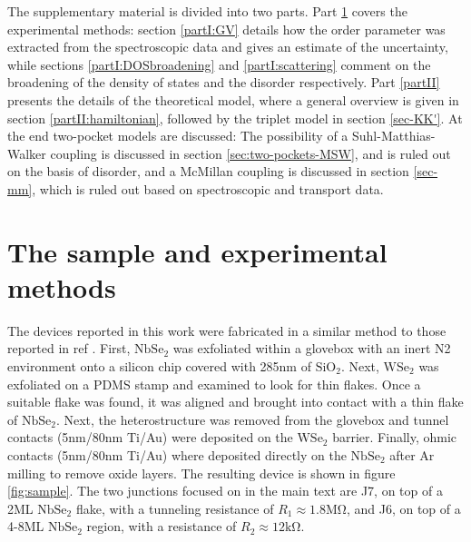 \documentclass[showpacs,superscriptaddress,onecolumn,prb]{revtex4}
\begin{document}
\maketitle 

\renewcommand{\theequation}{S\arabic{equation}}
\renewcommand{\thefigure}{S\arabic{figure}}
\renewcommand{\bibnumfmt}[1]{[S#1]}
\renewcommand{\citenumfont}[1]{S#1}

The supplementary material is divided into two parts. Part \ref{partI} covers the experimental methods: section \ref{partI:GV} details how the order parameter was extracted from the spectroscopic data and gives an estimate of the uncertainty, while sections \ref{partI:DOSbroadening} and \ref{partI:scattering} comment on the broadening of the density of states and the disorder respectively. Part \ref{partII} presents the details of the theoretical model, where a general overview is given in section \ref{partII:hamiltonian}, followed by the triplet model in section \ref{sec-KK'}. At the end two-pocket models are discussed: 
The possibility of a Suhl-Matthias-Walker coupling is discussed in section \ref{sec:two-pockets-MSW}, and is ruled out on the basis of disorder, and a McMillan coupling is discussed in section \ref{sec-mm}, which is ruled out based on spectroscopic and transport data.

\bigskip

\section{The sample and experimental methods}\label{partI}

The devices reported in this work were fabricated in a similar method to those reported in ref \cite{dvir2018}. First, $\mathrm{NbSe_2}$ was exfoliated within a glovebox with an inert N2 environment onto a silicon chip covered with 285nm of $\mathrm{SiO_2}$. Next, $\mathrm{WSe_2}$ was exfoliated on a PDMS stamp and examined to look for thin flakes. Once a suitable flake was found, it was aligned and brought into contact with a thin flake of $\mathrm{NbSe_2}$. Next, the heterostructure was removed from the glovebox and tunnel contacts (5nm/80nm Ti/Au) were deposited on the $\mathrm{WSe_2}$ barrier. Finally, ohmic contacts (5nm/80nm Ti/Au) where deposited directly on the $\mathrm{NbSe_2}$ after Ar milling to remove oxide layers. The resulting device is shown in figure \ref{fig:sample}. The two junctions focused on in the main text are J7, on top of a 2ML $\mathrm{NbSe_2}$ flake, with a tunneling resistance of $R_1\approx 1.8\mathrm{M\Omega}$, and J6, on top of a 4-8ML $\mathrm{NbSe_2}$ region,  with a resistance of $R_2\approx 12\mathrm{k\Omega}$.
\end{document}

